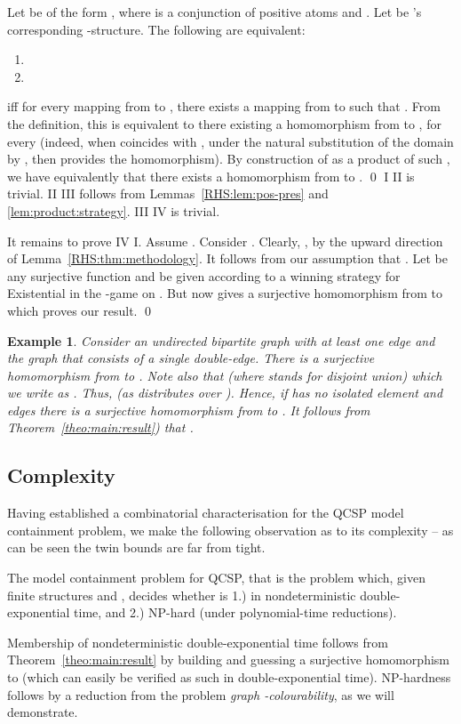 \documentclass{LMCS}
\newtheorem{ex}{Example}
\begin{document}
\begin{lem}
\label{RHS:thm:methodology}
  Let  be of the form , where  is a conjunction of positive atoms and . Let  be 's corresponding
  -structure. The following are equivalent:
  \begin{enumerate}[label=(\roman*)]
  \item 
  \item 
  \end{enumerate}
\end{lem}
\proof
   iff for every mapping  from  to
  , there exists a mapping  from  to  such that
.
From the definition, this is equivalent to there existing a homomorphism from  to , for every  (indeed, when  coincides with , under the natural substitution of the domain  by , then   provides the homomorphism).
 By construction of  as a product of such
  , we have equivalently that there exists a homomorphism
  from  to .
\qed
{}
I  II  is trivial. II  III follows from Lemmas~\ref{RHS:lem:pos-pres} and \ref{lem:product:strategy}.  III  IV is trivial. 

It remains to prove  IV  I. Assume . Consider . Clearly, , by the upward direction of Lemma~\ref{RHS:thm:methodology}. It follows from our assumption that . Let  be any surjective function and  be given according to a winning strategy for Existential in the -game on . But now  gives a surjective homomorphism from  to  which proves our result.
\qed
\begin{ex}\label{ex:bip}
  Consider an undirected bipartite graph with at least one edge
   and  the graph that consists of a single double-edge.
  There is a surjective homomorphism from  to .
  Note also that  (where  stands for disjoint union)
  which we write as . Thus,  (as 
  distributes over ). Hence, if  has no isolated element and
   edges there is a surjective homomorphism from  to . It follows from Theorem~\ref{theo:main:result}) that  .
\end{ex}

\subsection{Complexity}
\label{RHS:Complexity}

Having established a combinatorial characterisation for the QCSP model containment problem, we make the following observation as to its complexity -- as can be seen the twin bounds are far from tight.
\begin{thm}
The model containment problem for QCSP, that is the problem which, given finite structures  and , decides whether  is 1.) in nondeterministic double-exponential time, and 2.) NP-hard (under polynomial-time reductions).
\end{thm}
\proof
Membership of nondeterministic double-exponential time follows from Theorem~\ref{theo:main:result} by building  and guessing a surjective homomorphism to  (which can easily be verified as such in double-exponential time). NP-hardness follows by a reduction from the problem \emph{graph -colourability}, as we will demonstrate.
\end{document}
